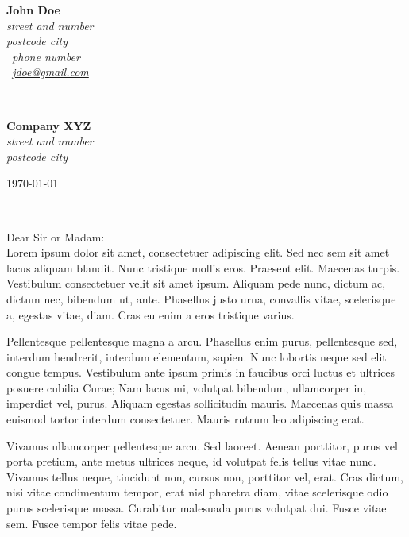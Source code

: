 \documentclass[11pt]{article}
\begin{document}
\sffamily   %
\hfill%
\begin{minipage}[t]{.6\textwidth}
\raggedleft%
{\bfseries John Doe}\\[.35ex]
\small\itshape%
street and number\\
postcode city\\[.35ex]
\Telefon~phone number\\
\Letter~\href{mailto:jdoe@gmail.com}{jdoe@gmail.com}
\end{minipage}\\[1em]
%
\begin{minipage}[t]{.4\textwidth}
\raggedright%
{\bfseries Company XYZ}\\[.35ex]
\small\itshape%
street and number\\
postcode city
\end{minipage}
\hfill %
\begin{minipage}[t]{.4\textwidth}
\raggedleft %
\today
\end{minipage}\\[2em]
\raggedright
Dear Sir or Madam:\\[1.5em]
%
Lorem ipsum dolor sit amet, consectetuer adipiscing elit. Sed nec sem sit amet lacus aliquam blandit. Nunc tristique mollis eros. Praesent elit. Maecenas turpis. Vestibulum consectetuer velit sit amet ipsum. Aliquam pede nunc, dictum ac, dictum nec, bibendum ut, ante. Phasellus justo urna, convallis vitae, scelerisque a, egestas vitae, diam. Cras eu enim a eros tristique varius.

Pellentesque pellentesque magna a arcu. Phasellus enim purus, pellentesque sed, interdum hendrerit, interdum elementum, sapien. Nunc lobortis neque sed elit congue tempus. Vestibulum ante ipsum primis in faucibus orci luctus et ultrices posuere cubilia Curae; Nam lacus mi, volutpat bibendum, ullamcorper in, imperdiet vel, purus. Aliquam egestas sollicitudin mauris. Maecenas quis massa euismod tortor interdum consectetuer. Mauris rutrum leo adipiscing erat.

Vivamus ullamcorper pellentesque arcu. Sed laoreet. Aenean porttitor, purus vel porta pretium, ante metus ultrices neque, id volutpat felis tellus vitae nunc. Vivamus tellus neque, tincidunt non, cursus non, porttitor vel, erat. Cras dictum, nisi vitae condimentum tempor, erat nisl pharetra diam, vitae scelerisque odio purus scelerisque massa. Curabitur malesuada purus volutpat dui. Fusce vitae sem. Fusce tempor felis vitae pede.
\end{document}
